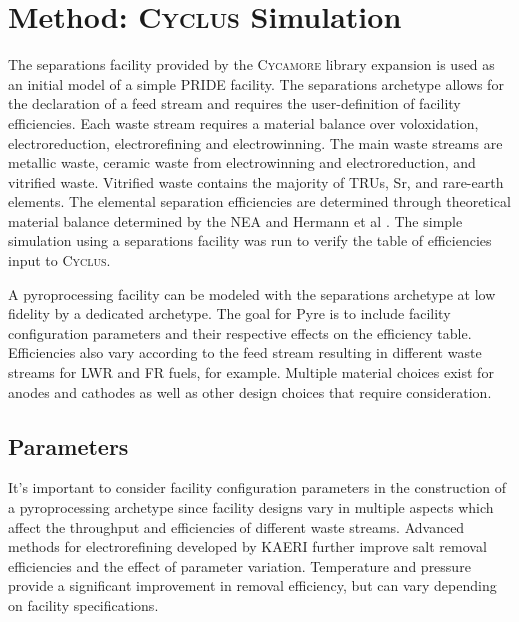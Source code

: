 \documentclass{anstrans}
\newcommand{\Cyclus}{\textsc{Cyclus}\xspace}%
\newcommand{\Cycamore}{\textsc{Cycamore}\xspace}%
\begin{document}
\section{Method: \Cyclus Simulation}
The separations facility provided by the \Cycamore library expansion is used as an initial model of a simple PRIDE facility. 
The separations archetype allows for the declaration of a feed stream and requires the user-definition of facility efficiencies. 
Each waste stream requires a material balance over voloxidation, electroreduction, electrorefining and electrowinning. The main 
waste streams are metallic waste, ceramic waste from electrowinning and electroreduction, and vitrified waste. Vitrified 
waste contains the majority of TRUs, Sr, and rare-earth elements. The elemental separation efficiencies are 
determined through theoretical material balance determined by the NEA and Hermann et al \cite{flowsheet_1998,herrmann_separation_2010}. 
The simple simulation using a separations facility was run to verify the table of efficiencies input to \Cyclus.

A pyroprocessing facility can be modeled with the separations archetype at low fidelity 
by a dedicated archetype. The goal for Pyre is to include facility configuration parameters and 
their respective effects on the efficiency table. Efficiencies also vary according to the feed stream resulting in different 
waste streams for LWR and FR fuels, for example. Multiple material choices exist for anodes and cathodes as well as other 
design choices that require consideration. 

\subsection{Parameters}
It's important to consider facility configuration parameters in the construction of a pyroprocessing archetype since facility designs vary in 
multiple aspects which affect the throughput and efficiencies of different waste streams. Advanced methods for electrorefining 
developed by KAERI \cite{lee_advanced_2008} further improve salt removal efficiencies and the effect of parameter variation. 
Temperature and pressure provide a significant improvement in removal efficiency, but can vary depending on facility specifications. 
\end{document}
